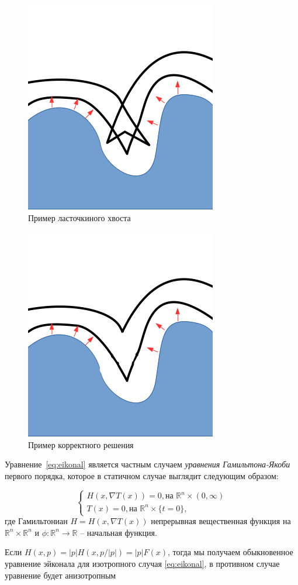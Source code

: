 \begin{figure}[h]
  \centering
  \includegraphics[width=0.3\linewidth]{img/swallow-tail-example.png}
  \hfil \caption{Пример ласточкиного хвоста}
  \label{fig:swallow-ex}

\end{figure}

\begin{figure}[h]
  \centering
  \includegraphics[width=0.3\linewidth]{img/corrct-example.png}
  \hfil \caption{Пример корректного решения}
  \label{fig:correct-exmp}

\end{figure}

Уравнение~\eqref{eq:eikonal} является частным случаем \textit{уравнения
Гамильтона-Якоби} первого порядка, которое в статичном случае выглядит
следующим образом:

\begin{equation}
  \label{eq:hje}
  \left\{ \begin{matrix}
      H(x, \nabla T(x)) = 0,\text{на } \mathbb{R}^n \times (0,\infty) \\
      T(x) = 0,  \text{на } \mathbb{R}^n \times \{t = 0\},
    \end{matrix}\right.
\end{equation}
где Гамильтониан $H = H(x,\nabla T(x))$ непрерывная вещественная функция на
$\mathbb{R}^n \times \mathbb{R}^n$ и $\phi : \mathbb{R}^n \rightarrow
\mathbb{R}$ -- начальная функция.

Если $H(x,p) = |p| H(x,p/|p|) = |p| F(x)$, тогда мы получаем
обыкновенное уравнение эйконала для изотропного случая
\eqref{eq:eikonal}, в противном случае уравнение будет анизотропным

